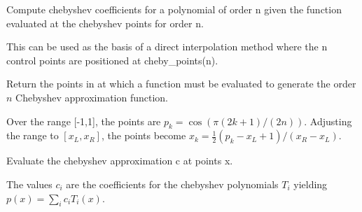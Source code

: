 \documentclass[letterpaper,10pt,english]{sphinxmanual}
\begin{document}

\begin{fulllineitems}
\label{api/cheby:refl1d.cheby.cheby_coeff}
Compute chebyshev coefficients for a polynomial of order n given
the function evaluated at the chebyshev points for order n.

This can be used as the basis of a direct interpolation method where
the n control points are positioned at cheby\_points(n).

\end{fulllineitems}


\begin{fulllineitems}
\label{api/cheby:refl1d.cheby.cheby_points}
Return the points in at which a function must be evaluated to
generate the order $n$ Chebyshev approximation function.

Over the range {[}-1,1{]}, the points are $p_k = \cos(\pi(2 k + 1)/(2n))$.
Adjusting the range to $[x_L,x_R]$, the points become
$x_k = \frac{1}{2} (p_k - x_L + 1)/(x_R-x_L)$.

\end{fulllineitems}


\begin{fulllineitems}
\label{api/cheby:refl1d.cheby.cheby_val}
Evaluate the chebyshev approximation c at points x.

The values $c_i$ are the coefficients for the chebyshev
polynomials $T_i$ yielding $p(x) = \sum_i{c_i T_i(x)}$.

\end{fulllineitems}
\end{document}
